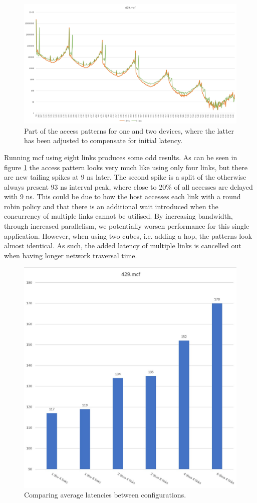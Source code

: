 \begin{figure}[!h]
    \centering
    \includegraphics[width=1.0\linewidth]{figure/429-2.4-8.jpg}
    \caption{Part of the access patterns for one and two devices, where the latter has been adjusted to compensate for initial latency.}
    \label{Memory-access-429-link-compare}
\end{figure}

Running mcf using eight links produces some odd results. As can be seen in figure \ref{Memory-access-429-link-compare} the access pattern looks very much like using only four links, but there are new tailing spikes at 9 ns later. The second spike is a split of the otherwise always present 93 ns interval peak, where close to 20\% of all accesses are delayed with 9 ns. This could be due to how the host accesses each link with a round robin policy and that there is an additional wait introduced when the concurrency of multiple links cannot be utilised. By increasing bandwidth, through increased parallelism, we potentially worsen performance for this single application. However, when using two cubes, i.e. adding a hop, the patterns look almost identical. As such, the added latency of multiple links is cancelled out when having longer network traversal time.
\bigskip

\begin{figure}[!h]
    \centering
    \includegraphics[width=0.75\linewidth]{figure/429-averages.jpg}
    \caption{Comparing average latencies between configurations.}
    \label{Memory-access-429-average-latency}
\end{figure}

